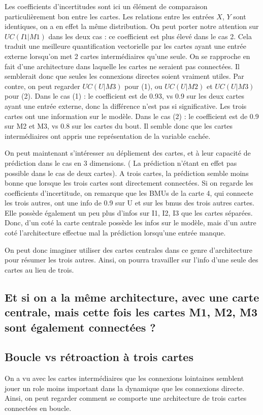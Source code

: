 Les coefficients d'incertitudes sont ici un élément de comparaison particulièrement bon entre les cartes. Les relations entre les entrées $X$, $Y$ sont identiques, on a en effet la même distribution. 
On peut porter notre attention sur $UC(I1|M1)$ dans les deux cas : ce coefficient est plus élevé dans le cas 2.
Cela traduit une meilleure quantification vectorielle par les cartes ayant une entrée externe lorsqu'on met 2 cartes intermédiaires qu'une seule. On se rapproche en fait d'une architecture dans laquelle les cartes ne seraient pas connectées. Il semblerait donc que seules les connexions directes soient vraiment utiles. 
Par contre, on peut regarder $UC(U|M3)$ pour (1), ou $UC(U|M2)$ et $UC(U|M3)$ pour (2). 
Dans le cas (1) : le coefficient est de 0.93, vs 0.9 sur les deux cartes ayant une entrée externe, donc la différence n'est pas si significative. Les trois cartes ont une information sur le modèle.
Dans le cas (2) : le coefficient est de 0.9 sur M2 et M3, vs 0.8 sur les cartes du bout. Il semble donc que les cartes intermédiaires ont appris une représentation de la variable cachée.

On peut maintenant s'intéresser au dépliement des cartes, et à leur capacité de prédiction dans le cas en 3 dimensions. ( La prédiction n'étant en effet pas possible dans le cas de deux cartes). A trois cartes, la prédiction semble moins bonne que lorsque les trois cartes sont directement connectées. 
Si on regarde les coefficients d'incertitude, on remarque que les BMUs de la carte 4, qui connecte les trois autres, ont une info de 0.9 sur U et sur les bmus des trois autres cartes. Elle possède également un peu plus d'infos sur I1, I2, I3 que les cartes séparées. 
Donc, d'un coté la carte centrale possède les infos sur le modèle, mais d'un autre coté l'architecture effectue mal la prédiction lorsqu'une entrée manque. 

On peut donc imaginer utiliser des cartes centrales dans ce genre d'architecture pour résumer les trois autres. Ainsi, on pourra travailler sur l'info d'une seule des cartes au lieu de trois.

\subsection{Et si on a la même architecture, avec une carte centrale, mais cette fois les cartes M1, M2, M3 sont également connectées ?}



\subsection{Boucle vs rétroaction à trois cartes}
On a vu avec les cartes intermédiaires que les connexions lointaines semblent jouer un role moins important dans la dynamique que les connexions directe. Ainsi, on peut regarder comment se comporte une architecture de trois cartes connectées en boucle.



